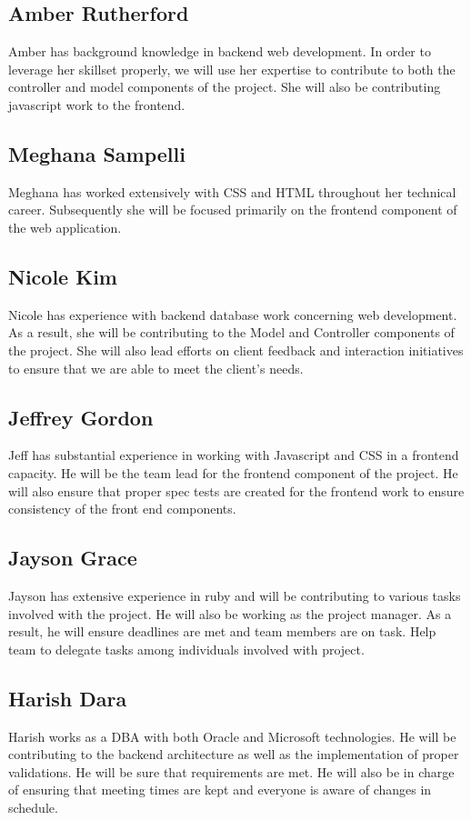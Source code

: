 \documentclass[12pt, a4paper, oneside]{article}
\begin{document}
\subsection*{Amber Rutherford}
Amber has background knowledge in backend web development. In order to leverage her skillset properly, we will use her expertise to contribute to both the controller and model components of the project.  She will also be contributing javascript work to the frontend.

\subsection*{Meghana Sampelli}
Meghana has worked extensively with CSS and HTML throughout her technical career. Subsequently she will be focused primarily on the frontend component of the web application.

\subsection*{Nicole Kim}
Nicole has experience with backend database work concerning web development. As a result, she will be contributing to the Model and Controller components of the project. She will also lead efforts on client feedback and interaction initiatives to ensure that we are able to meet the client's needs.

\subsection*{Jeffrey Gordon}
Jeff has substantial experience in working with Javascript and CSS in a frontend capacity. He will be the team lead for the frontend component of the project. He will also ensure that proper spec tests are created for the frontend work to ensure consistency of the front end components.

\subsection*{Jayson Grace}
Jayson has extensive experience in ruby and will be contributing to various tasks involved with the project. He will also be working as the project manager. As a result, he will ensure deadlines are met and team members are on task. Help team to delegate tasks among individuals involved with project. 

\subsection*{Harish Dara}
Harish works as a DBA with both Oracle and Microsoft technologies. He will be contributing to the backend architecture as well as the implementation of proper validations. He will be sure that requirements are met. He will also be in charge of ensuring that meeting times are kept and everyone is aware of changes in schedule.   
\end{document}

